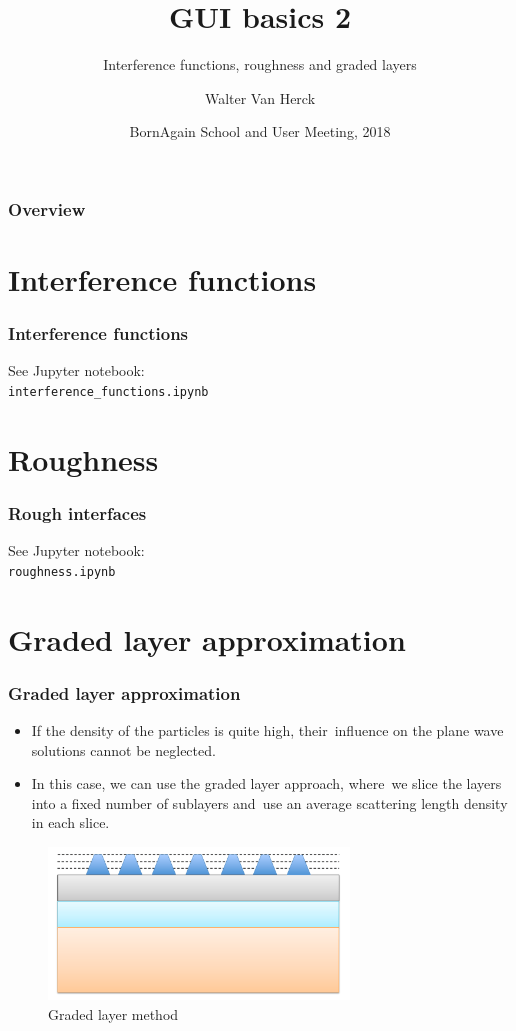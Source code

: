 \documentclass{beamer}
\title{GUI basics 2}
\subtitle{Interference functions, roughness and graded layers}
\author
{Walter Van Herck\inst{1}}
\institute[JCNS at MLZ] %
{
  \inst{1}%
  J\"ulich Centre for Neutron Science at MLZ
}
\date[BornAgain] %
{BornAgain School and User Meeting, 2018}
\begin{document}
\frame[plain]{\titlepage}

\begin{frame}
    \frametitle{Overview}
    \tableofcontents
\end{frame}

\section{Interference functions}

\begin{frame}[fragile]
    \frametitle{Interference functions}
    \begin{center}
        See Jupyter notebook:\\
        \verb+interference_functions.ipynb+
    \end{center}
\end{frame}

\section{Roughness}

\begin{frame}[fragile]
    \frametitle{Rough interfaces}
    \begin{center}
        See Jupyter notebook:\\
        \verb+roughness.ipynb+
    \end{center}
\end{frame}

\section{Graded layer approximation}

\begin{frame}
    \frametitle{Graded layer approximation}
    \begin{itemize}
        \item If the density of the particles is quite high, their\
                influence on the plane wave solutions cannot be neglected.
        \item In this case, we can use the graded layer approach, where\
                we slice the layers into a fixed number of sublayers and\
                use an average scattering length density in each slice.
    \end{itemize}
    \begin{figure}
        \includegraphics[width=8cm]{graded_layer.png}
        \\ Graded layer method
    \end{figure}
\end{frame}
\end{document}
